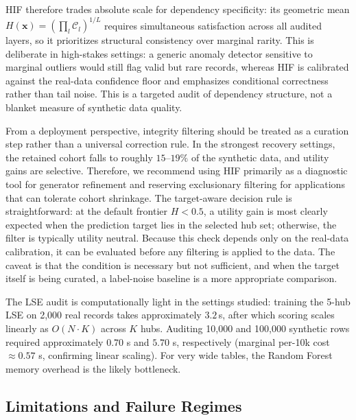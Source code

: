 \documentclass[pdflatex,sn-mathphys-num]{sn-jnl}
\theoremstyle{thmstyleone}%
\theoremstyle{thmstyletwo}%
\theoremstyle{thmstylethree}%
\begin{document}
HIF therefore trades absolute scale for dependency specificity: its geometric mean $H(\mathbf{x}) = \left(\prod_l \mathcal{C}_l\right)^{1/L}$ requires simultaneous satisfaction across all audited layers, so it prioritizes structural consistency over marginal rarity. This is deliberate in high-stakes settings: a generic anomaly detector sensitive to marginal outliers would still flag valid but rare records, whereas HIF is calibrated against the real-data confidence floor and emphasizes conditional correctness rather than tail noise. This is a targeted audit of dependency structure, not a blanket measure of synthetic data quality.

From a deployment perspective, integrity filtering should be treated as a curation step rather than a universal correction rule. In the strongest recovery settings, the retained cohort falls to roughly $15$--$19\%$ of the synthetic data, and utility gains are selective. Therefore, we recommend using HIF primarily as a diagnostic tool for generator refinement and reserving exclusionary filtering for applications that can tolerate cohort shrinkage. The target-aware decision rule is straightforward: at the default frontier $H < 0.5$, a utility gain is most clearly expected when the prediction target lies in the selected hub set; otherwise, the filter is typically utility neutral. Because this check depends only on the real-data calibration, it can be evaluated before any filtering is applied to the data. The caveat is that the condition is necessary but not sufficient, and when the target itself is being curated, a label-noise baseline is a more appropriate comparison.

The LSE audit is computationally light in the settings studied: training the 5-hub LSE on 2,000 real records takes approximately $3.2$\,s, after which scoring scales linearly as $O(N \cdot K)$ across $K$ hubs. Auditing 10,000 and 100,000 synthetic rows required approximately $0.70$ s and $5.70$ s, respectively (marginal per-10k cost $\approx 0.57$ s, confirming linear scaling). For very wide tables, the Random Forest memory overhead is the likely bottleneck.

\subsection{Limitations and Failure Regimes}\label{sec:limitations}
\end{document}
